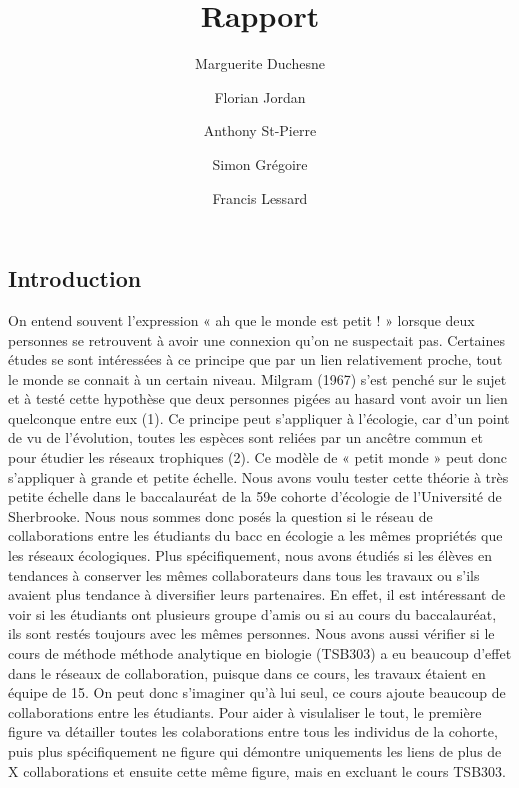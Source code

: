 \documentclass[9pt,twocolumn,twoside,]{pnas-new}
\title{Rapport}
\author[a]{Marguerite Duchesne}
\author[a]{Florian Jordan}
\author[a]{Anthony St-Pierre}
\author[a]{Simon Grégoire}
\author[a]{Francis Lessard}
\affil[a]{Université de Sherbrooke, Départment de biologie, 2500
Boulevard de l'Université, Sherbrooke, Québec, J1K 2R1}
\begin{document}
\verticaladjustment{-2pt}



\maketitle
\thispagestyle{firststyle}


\acknow{}

\hypertarget{introduction}{%
\subsection{Introduction}\label{introduction}}

On entend souvent l'expression « ah que le monde est petit ! » lorsque
deux personnes se retrouvent à avoir une connexion qu'on ne suspectait
pas. Certaines études se sont intéressées à ce principe que par un lien
relativement proche, tout le monde se connait à un certain niveau.
Milgram (1967) s'est penché sur le sujet et à testé cette hypothèse que
deux personnes pigées au hasard vont avoir un lien quelconque entre eux
(1). Ce principe peut s'appliquer à l'écologie, car d'un point de vu de
l'évolution, toutes les espèces sont reliées par un ancêtre commun et
pour étudier les réseaux trophiques (2). Ce modèle de « petit monde »
peut donc s'appliquer à grande et petite échelle. Nous avons voulu
tester cette théorie à très petite échelle dans le baccalauréat de la
59e cohorte d'écologie de l'Université de Sherbrooke. Nous nous sommes
donc posés la question si le réseau de collaborations entre les
étudiants du bacc en écologie a les mêmes propriétés que les réseaux
écologiques. Plus spécifiquement, nous avons étudiés si les élèves en
tendances à conserver les mêmes collaborateurs dans tous les travaux ou
s'ils avaient plus tendance à diversifier leurs partenaires. En effet,
il est intéressant de voir si les étudiants ont plusieurs groupe d'amis
ou si au cours du baccalauréat, ils sont restés toujours avec les mêmes
personnes. Nous avons aussi vérifier si le cours de méthode méthode
analytique en biologie (TSB303) a eu beaucoup d'effet dans le réseaux de
collaboration, puisque dans ce cours, les travaux étaient en équipe de
15. On peut donc s'imaginer qu'à lui seul, ce cours ajoute beaucoup de
collaborations entre les étudiants. Pour aider à visulaliser le tout, le
première figure va détailler toutes les colaborations entre tous les
individus de la cohorte, puis plus spécifiquement ne figure qui démontre
uniquements les liens de plus de X collaborations et ensuite cette même
figure, mais en excluant le cours TSB303.
\end{document}
